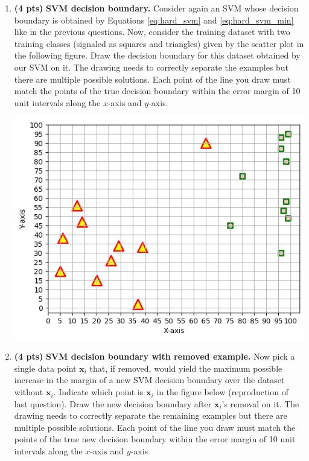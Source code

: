 \documentclass{article}
\begin{document}
\begin{enumerate}[1.]
        
\item {\bf (4 pts)} {\bf  SVM decision boundary.}
Consider again an SVM whose decision boundary is obtained by Equations \ref{eq:hard_svm} and 
 \ref{eq:hard_svm_min} like in the previous questions. Now, consider the training dataset with two training classes (signaled as squares and triangles) given by the scatter plot in the following figure. Draw the decision boundary for this dataset obtained by our SVM on it. The drawing needs to correctly separate the examples but there are multiple possible solutions. Each point of the line you draw must match the points of the true decision boundary within the error margin of 10 unit intervals along the $x$-axis and $y$-axis. 
 \begin{tcolorbox}[breakable,
enhanced,
notitle,
width=15.8cm,
height=15cm]  
\includegraphics[width=1
\linewidth]{./figures/svm_graph1.png}
\end{tcolorbox}

\newpage

\item {\bf (4 pts)} {\bf  SVM decision boundary with removed example.} Now pick a single data point $\mathbf{x}_i$ that, if removed, would yield the maximum possible increase in the margin of a new SVM decision boundary over the dataset without $\mathbf{x}_i$. Indicate which point is $\mathbf{x}_i$ in the figure below (reproduction of last question). Draw the new decision boundary after $\mathbf{x}_i$'s removal on it. The drawing needs to correctly separate the remaining examples but there are multiple possible solutions. Each point of the line you draw must match the points of the true new decision boundary within the error margin of 10 unit intervals along the $x$-axis and $y$-axis.
 

\end{enumerate}
\end{document}
